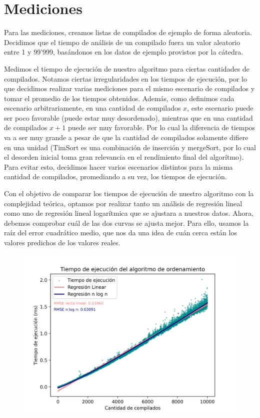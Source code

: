 \section{Mediciones}

Para las mediciones, creamos listas de compilados de ejemplo de forma aleatoria. Decidimos que el tiempo
de análisis de un compilado fuera un valor aleatorio entre 1 y 99'999, basándonos en los datos de ejemplo
provistos por la cátedra.

Medimos el tiempo de ejecución de nuestro algoritmo para ciertas cantidades de compilados. Notamos ciertas irregularidades en los tiempos de ejecución,
por lo que decidimos realizar varias mediciones para el mismo escenario de compilados y tomar el promedio de los tiempos obtenidos.
Además, como definimos cada escenario arbitrariamente, en una cantidad de compilados $x$, este escenario puede ser poco favorable (puede estar muy desordenado),
mientras que en una cantidad de compilados $x+1$ puede ser muy favorable. Por lo cual la diferencia de tiempos va a ser muy grande a pesar de que la cantidad
de compilados solamente difiere en una unidad (TimSort es una combinación de inserción y mergeSort, por lo cual el desorden inicial toma gran relevancia en el 
rendimiento final del algorítmo). Para evitar esto, decidimos hacer varios escenarios distintos para la misma cantidad de compilados, promediando a su vez, los 
tiempos de ejecución.

Con el objetivo de comparar los tiempos de ejecución de nuestro algoritmo con la complejidad teórica, optamos por 
realizar tanto un análisis de regresión lineal como uno de regresión lineal logarítmica que se ajustara a nuestros datos.
Ahora, debemos comprobar cuál de las dos curvas se ajusta mejor. Para ello, usamos la raíz del
error cuadrático medio, que nos da una idea de cuán cerca están los valores predichos de los valores reales.

\begin{figure}[H]
    \centering
    \includegraphics[width=1\textwidth]{img/tiempos_ejecucion.png}
\end{figure}

